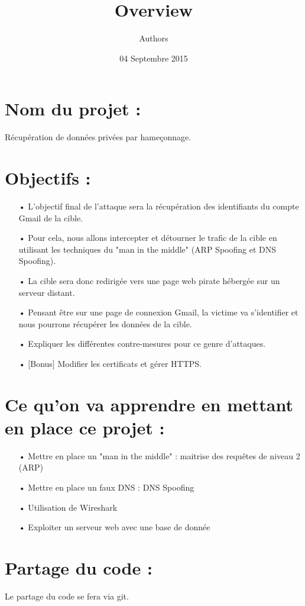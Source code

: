 \documentclass[a4paper, 11pt]{article}
\title{Overview}
\author{Authors}
\date{04 Septembre 2015}
\begin{document}
\maketitle

\section*{Nom du projet :}
Récupération de données privées par hameçonnage.

\section*{Objectifs :} 

\begin{itemize}
	\item[•] L'objectif final de l'attaque sera la récupération des identifiants du compte Gmail de la cible. 
	\item[•] Pour cela, nous allons intercepter et détourner le trafic de la cible en utilisant les techniques du "man in the middle" (ARP Spoofing et DNS Spoofing).
	\item[•] La cible sera donc redirigée vers une page web pirate hébergée sur un serveur distant.
	\item[•] Pensant être sur une page de connexion Gmail, la victime va s'identifier et nous pourrons récupérer les données de la cible.
	\item[•] Expliquer les différentes contre-mesures pour ce genre d'attaques.
 	\item[•] [Bonus] Modifier les certificats et gérer HTTPS.
\end{itemize}

\section*{Ce qu'on va apprendre en mettant en place ce projet : }
\begin{itemize}
	\item[•] Mettre en place un "man in the middle" : maitrise des requêtes de niveau 2 (ARP)
	\item[•] Mettre en place un faux DNS : DNS Spoofing
	\item[•] Utilisation de Wireshark
	\item[•] Exploiter un serveur web avec une base de donnée
\end{itemize}

\section*{Partage du code : }
Le partage du code se fera via git.
\end{document}
